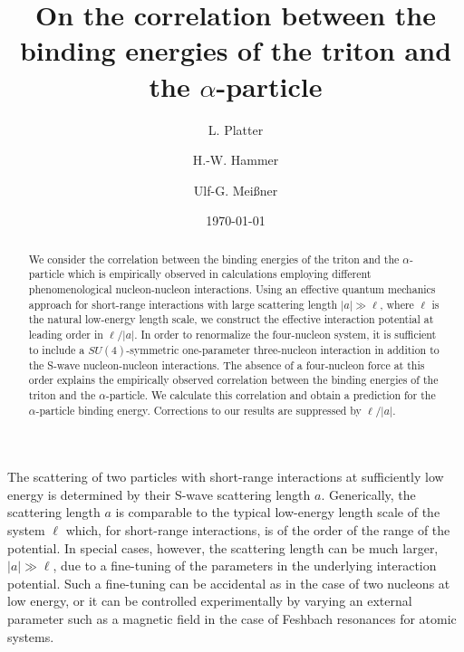 \documentclass[prc,preprint,tightenlines,showpacs]{revtex4}
\begin{document}
%
%
\title{On the correlation between the binding energies of the 
 triton and the $\alpha$-particle}
%
\author{L. Platter}
%
\author{H.-W. Hammer}
%
\author{Ulf-G. Mei{\ss}ner}
%
\date{\today}
\begin{abstract}
We consider the correlation between the binding energies of the 
triton and the $\alpha$-particle which is empirically observed
in calculations employing different phenomenological nucleon-nucleon
interactions. Using an effective quantum mechanics approach
for short-range interactions with large scattering length $|a|\gg \ell$,
where $\ell$ is the natural low-energy length scale,
we construct the effective interaction potential at leading order in 
$\ell/|a|$.
In order to renormalize the four-nucleon system, it is sufficient to include
a $SU(4)$-symmetric one-parameter three-nucleon interaction in addition to
the S-wave nucleon-nucleon interactions. The absence of a four-nucleon
force at this order explains the empirically observed correlation between the 
binding energies of the triton and the $\alpha$-particle. 
We calculate this correlation and obtain a prediction for the $\alpha$-particle
binding energy. Corrections to our results are suppressed by $\ell/|a|$.
\end{abstract}
\maketitle
%
%
%
%
The scattering of two particles with short-range interactions 
at sufficiently low energy is determined by their S-wave scattering length
$a$. Generically, the scattering length $a$ is comparable to the 
typical low-energy length scale 
of the system $\ell$ which,  for short-range interactions,
is of the order of the range of the potential. 
In special cases, however, the scattering length can be much larger,
$|a|\gg \ell$, due to a fine-tuning of the parameters in the underlying 
interaction potential. Such a fine-tuning can be accidental 
as in the case of two nucleons at low energy, or it can be controlled 
experimentally by varying an external parameter such as a 
magnetic field in the case of Feshbach resonances for atomic systems.
\end{document}
